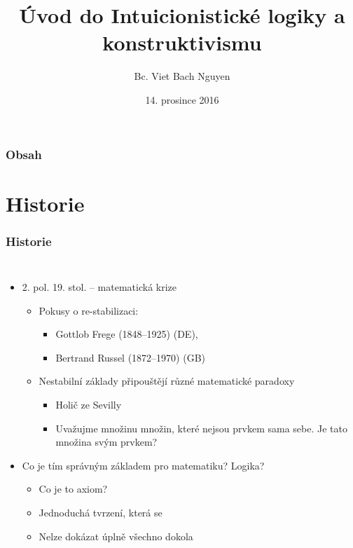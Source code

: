 \documentclass[aspectratio=169]{beamer}
\title[Intuicionismus]{Úvod do Intuicionistické logiky a konstruktivismu}
\author{Bc. Viet Bach Nguyen}
\institute[KIZI] {
    Vysoká škola ekonomická v Praze \\
    \medskip
    \textit{nguv03@vse.cz}
}
\date{14. prosince 2016}
\begin{document}
\begin{frame}
\titlepage
\end{frame}

\begin{frame}
\frametitle{Obsah}
\tableofcontents
\end{frame}

\section{Historie} 

\begin{frame}
\frametitle{Historie}
\begin{columns}

\begin{itemize}
\item 2. pol. 19. stol. -- matematická krize
    
    \begin{itemize}
    \item Pokusy o re-stabilizaci: 
        \begin{itemize}
        \item Gottlob Frege (1848--1925) (DE), 
        \item Bertrand Russel (1872--1970) (GB)
        \end{itemize}
    \end{itemize}

    \begin{itemize}
    \item Nestabilní základy připouštějí různé matematické paradoxy 

        \begin{itemize}
        \item Holič ze Sevilly
        \item Uvažujme množinu množin, které nejsou prvkem sama sebe. Je tato množina svým prvkem?
        \end{itemize}
    
    \end{itemize}

\item Co je tím správným základem pro matematiku? Logika?
    \begin{itemize}
    \item Co je to axiom?
    \item Jednoduchá tvrzení, která se 
    \item Nelze dokázat úplně všechno dokola
    \end{itemize}


\end{itemize}
\end{columns}
\end{frame}
\end{document}
